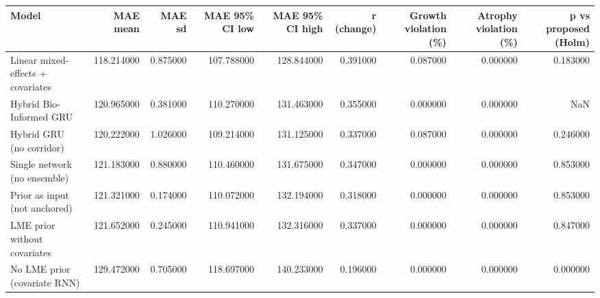 \begin{tabular}{lrrrrrrrr}
\toprule
Model & MAE mean & MAE sd & MAE 95\% CI low & MAE 95\% CI high & r (change) & Growth violation (\%) & Atrophy violation (\%) & p vs proposed (Holm) \\
\midrule
Linear mixed-effects + covariates & 118.214000 & 0.875000 & 107.788000 & 128.844000 & 0.391000 & 0.087000 & 0.000000 & 0.183000 \\
Hybrid Bio-Informed GRU & 120.965000 & 0.381000 & 110.270000 & 131.463000 & 0.355000 & 0.000000 & 0.000000 & NaN \\
Hybrid GRU (no corridor) & 120.222000 & 1.026000 & 109.214000 & 131.125000 & 0.337000 & 0.087000 & 0.000000 & 0.246000 \\
Single network (no ensemble) & 121.183000 & 0.880000 & 110.460000 & 131.675000 & 0.347000 & 0.000000 & 0.000000 & 0.853000 \\
Prior as input (not anchored) & 121.321000 & 0.174000 & 110.072000 & 132.194000 & 0.318000 & 0.000000 & 0.000000 & 0.853000 \\
LME prior without covariates & 121.652000 & 0.245000 & 110.941000 & 132.316000 & 0.337000 & 0.000000 & 0.000000 & 0.847000 \\
No LME prior (covariate RNN) & 129.472000 & 0.705000 & 118.697000 & 140.233000 & 0.196000 & 0.000000 & 0.000000 & 0.000000 \\
\bottomrule
\end{tabular}
